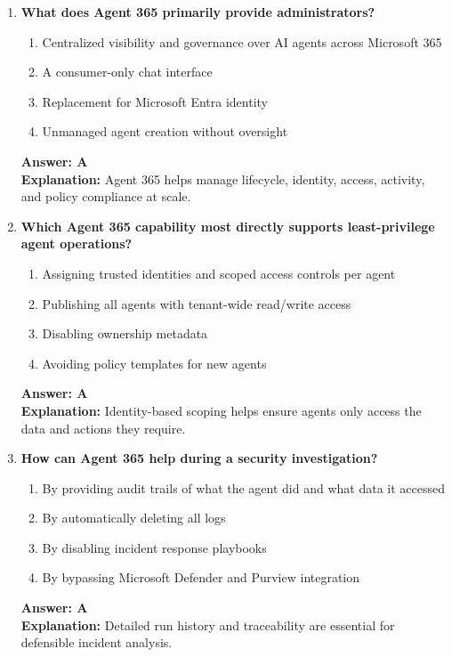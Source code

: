 \documentclass[10pt]{article}
\begin{document}
\begin{enumerate}[leftmargin=*]
\item \textbf{What does Agent 365 primarily provide administrators?}
\begin{enumerate}[label=\Alph*.]
  \item Centralized visibility and governance over AI agents across Microsoft 365
  \item A consumer-only chat interface
  \item Replacement for Microsoft Entra identity
  \item Unmanaged agent creation without oversight
\end{enumerate}
\textbf{Answer: A}\\
\textbf{Explanation:} Agent 365 helps manage lifecycle, identity, access, activity, and policy compliance at scale.

\item \textbf{Which Agent 365 capability most directly supports least-privilege agent operations?}
\begin{enumerate}[label=\Alph*.]
  \item Assigning trusted identities and scoped access controls per agent
  \item Publishing all agents with tenant-wide read/write access
  \item Disabling ownership metadata
  \item Avoiding policy templates for new agents
\end{enumerate}
\textbf{Answer: A}\\
\textbf{Explanation:} Identity-based scoping helps ensure agents only access the data and actions they require.

\item \textbf{How can Agent 365 help during a security investigation?}
\begin{enumerate}[label=\Alph*.]
  \item By providing audit trails of what the agent did and what data it accessed
  \item By automatically deleting all logs
  \item By disabling incident response playbooks
  \item By bypassing Microsoft Defender and Purview integration
\end{enumerate}
\textbf{Answer: A}\\
\textbf{Explanation:} Detailed run history and traceability are essential for defensible incident analysis.


\end{enumerate}
\end{document}
